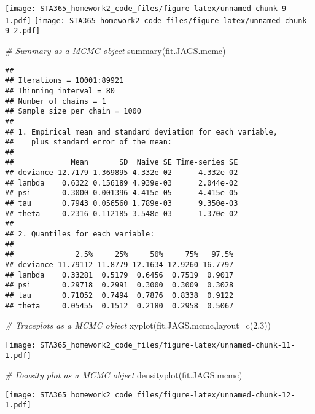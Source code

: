 \documentclass[
]{article}
\newenvironment{Shaded}{\begin{snugshade}}{\end{snugshade}}
\newcommand{\AttributeTok}[1]{\textcolor[rgb]{0.77,0.63,0.00}{#1}}
\newcommand{\CommentTok}[1]{\textcolor[rgb]{0.56,0.35,0.01}{\textit{#1}}}
\newcommand{\DecValTok}[1]{\textcolor[rgb]{0.00,0.00,0.81}{#1}}
\newcommand{\FunctionTok}[1]{\textcolor[rgb]{0.00,0.00,0.00}{#1}}
\newcommand{\NormalTok}[1]{#1}
\begin{document}
\texttt{[image: STA365\_homework2\_code\_files/figure-latex/unnamed-chunk-9-1.pdf]}
\texttt{[image: STA365\_homework2\_code\_files/figure-latex/unnamed-chunk-9-2.pdf]}

\begin{Shaded}
\begin{Highlighting}[]
\CommentTok{\# Summary as a MCMC object }
\FunctionTok{summary}\NormalTok{(fit.JAGS.mcmc)}
\end{Highlighting}
\end{Shaded}

\begin{verbatim}
## 
## Iterations = 10001:89921
## Thinning interval = 80 
## Number of chains = 1 
## Sample size per chain = 1000 
## 
## 1. Empirical mean and standard deviation for each variable,
##    plus standard error of the mean:
## 
##             Mean       SD  Naive SE Time-series SE
## deviance 12.7179 1.369895 4.332e-02      4.332e-02
## lambda    0.6322 0.156189 4.939e-03      2.044e-02
## psi       0.3000 0.001396 4.415e-05      4.415e-05
## tau       0.7943 0.056560 1.789e-03      9.350e-03
## theta     0.2316 0.112185 3.548e-03      1.370e-02
## 
## 2. Quantiles for each variable:
## 
##              2.5%     25%     50%     75%   97.5%
## deviance 11.79112 11.8779 12.1634 12.9260 16.7797
## lambda    0.33281  0.5179  0.6456  0.7519  0.9017
## psi       0.29718  0.2991  0.3000  0.3009  0.3028
## tau       0.71052  0.7494  0.7876  0.8338  0.9122
## theta     0.05455  0.1512  0.2180  0.2958  0.5067
\end{verbatim}

\begin{Shaded}
\begin{Highlighting}[]
\CommentTok{\# Traceplots as a MCMC object}
\FunctionTok{xyplot}\NormalTok{(fit.JAGS.mcmc,}\AttributeTok{layout=}\FunctionTok{c}\NormalTok{(}\DecValTok{2}\NormalTok{,}\DecValTok{3}\NormalTok{))}
\end{Highlighting}
\end{Shaded}

\texttt{[image: STA365\_homework2\_code\_files/figure-latex/unnamed-chunk-11-1.pdf]}

\begin{Shaded}
\begin{Highlighting}[]
\CommentTok{\# Density plot as a MCMC object}
\FunctionTok{densityplot}\NormalTok{(fit.JAGS.mcmc)}
\end{Highlighting}
\end{Shaded}

\texttt{[image: STA365\_homework2\_code\_files/figure-latex/unnamed-chunk-12-1.pdf]}
\end{document}
